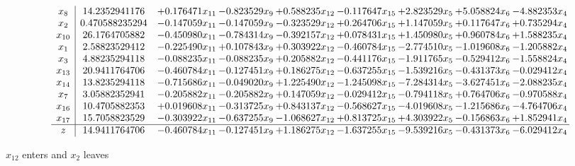 \documentclass[10pt]{article}
\begin{document}
 \[\begin{array}{c| c c@{\hskip 2pt} c@{\hskip 2pt} c@{\hskip 2pt} c@{\hskip 2pt} c@{\hskip 2pt} c@{\hskip 2pt} c@{\hskip 2pt} }
 x_{8}   &  14.2352941176 & + 0.176471 x_{11} & -0.823529 x_{9} & + 0.588235 x_{12} & -0.117647 x_{15} & + 2.823529 x_{5} & + 5.058824 x_{6} & -4.882353 x_{4}\\
 x_{2}   &  0.470588235294 & -0.147059 x_{11} & -0.147059 x_{9} & -0.323529 x_{12} & + 0.264706 x_{15} & + 1.147059 x_{5} & + 0.117647 x_{6} & + 0.735294 x_{4}\\
 x_{10}   &  26.1764705882 & -0.450980 x_{11} & -0.784314 x_{9} & -0.392157 x_{12} & + 0.078431 x_{15} & + 1.450980 x_{5} & + 0.960784 x_{6} & + 1.588235 x_{4}\\
 x_{1}   &  2.58823529412 & -0.225490 x_{11} & + 0.107843 x_{9} & + 0.303922 x_{12} & -0.460784 x_{15} & -2.774510 x_{5} & -1.019608 x_{6} & -1.205882 x_{4}\\
 x_{3}   &  4.88235294118 & -0.088235 x_{11} & -0.088235 x_{9} & + 0.205882 x_{12} & -0.441176 x_{15} & -1.911765 x_{5} & -0.529412 x_{6} & -1.558824 x_{4}\\
 x_{13}   &  20.9411764706 & -0.460784 x_{11} & -0.127451 x_{9} & + 0.186275 x_{12} & -0.637255 x_{15} & -1.539216 x_{5} & -0.431373 x_{6} & -0.029412 x_{4}\\
 x_{14}   &  13.8235294118 & -0.715686 x_{11} & -0.049020 x_{9} & + 1.225490 x_{12} & -1.245098 x_{15} & -7.284314 x_{5} & -3.627451 x_{6} & -2.088235 x_{4}\\
 x_{7}   &  3.05882352941 & -0.205882 x_{11} & -0.205882 x_{9} & + 0.147059 x_{12} & -0.029412 x_{15} & -0.794118 x_{5} & + 0.764706 x_{6} & -0.970588 x_{4}\\
 x_{16}   &  10.4705882353 & + 0.019608 x_{11} & -0.313725 x_{9} & + 0.843137 x_{12} & -0.568627 x_{15} & -4.019608 x_{5} & -1.215686 x_{6} & -4.764706 x_{4}\\
 x_{17}   &  15.7058823529 & -0.303922 x_{11} & -0.637255 x_{9} & -1.068627 x_{12} & + 0.813725 x_{15} & + 4.303922 x_{5} & -0.156863 x_{6} & + 1.852941 x_{4}\\
\hline
z    &  14.9411764706 & -0.460784 x_{11} & -0.127451 x_{9} & + 1.186275 x_{12} & -1.637255 x_{15} & -9.539216 x_{5} & -0.431373 x_{6} & -6.029412 x_{4}\\
\end{array}\]


 $ x_{12} $ enters and $ x_{2} $ leaves 
\end{document}
